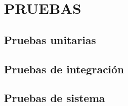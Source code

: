 \chapter[Pruebas]{
  \label{chp:pruebas}
  PRUEBAS
}
\thispagestyle{numberingStyle}
\pagestyle{numberingStyle}


\section{Pruebas unitarias}

\section{Pruebas de integración}

\section{Pruebas de sistema}